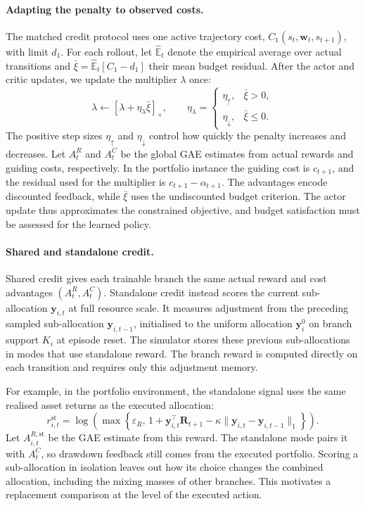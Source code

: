 \documentclass[10pt]{article}
\begin{document}
\paragraph{Adapting the penalty to observed costs.}
The matched credit protocol uses one active trajectory cost, $C_1(s_t,\bm w_t,s_{t+1})$, with limit $d_1$. For each rollout, let $\widehat{\mathbb E}_t$ denote the empirical average over actual transitions and $\bar\xi=\widehat{\mathbb E}_t[C_1-d_1]$ their mean budget residual. After the actor and critic updates, we update the multiplier $\lambda$ once:
\begin{equation}
  \lambda\leftarrow[\lambda+\eta_\lambda\bar\xi]_+,
  \qquad
  \eta_\lambda=
  \begin{cases}
    \eta_\uparrow,&\bar\xi>0,\\
    \eta_\downarrow,&\bar\xi\leq0.
  \end{cases}
  \label{eq:lambda}
\end{equation}
The positive step sizes $\eta_\uparrow$ and $\eta_\downarrow$ control how quickly the penalty increases and decreases. Let $A_t^R$ and $A_t^C$ be the global GAE estimates from actual rewards and guiding costs, respectively. In the portfolio instance the guiding cost is $c_{t+1}$, and the residual used for the multiplier is $c_{t+1}-\alpha_{t+1}$. The advantages encode discounted feedback, while $\bar\xi$ uses the undiscounted budget criterion. The actor update thus approximates the constrained objective, and budget satisfaction must be assessed for the learned policy.

\paragraph{Shared and standalone credit.}
Shared credit gives each trainable branch the same actual reward and cost advantages $(A_t^R,A_t^C)$. Standalone credit instead scores the current sub-allocation $\bm y_{i,t}$ at full resource scale. It measures adjustment from the preceding sampled sub-allocation $\bm y_{i,t-1}$, initialised to the uniform allocation $\bm y_i^0$ on branch support $K_i$ at episode reset. The simulator stores these previous sub-allocations in modes that use standalone reward. The branch reward is computed directly on each transition and requires only this adjustment memory.

For example, in the portfolio environment, the standalone signal uses the same realised asset returns as the executed allocation:
\begin{equation}
  r_{i,t}^{\mathrm{st}}=
  \log\!\left(\max\left\{\varepsilon_R,\,
    1+\bm y_{i,t}^{\top}\bm R_{t+1}
      -\kappa\lVert\bm y_{i,t}-\bm y_{i,t-1}\rVert_1\right\}\right).
  \label{eq:standalone-reward}
\end{equation}
Let $A_{i,t}^{R,\mathrm{st}}$ be the GAE estimate from this reward. The standalone mode pairs it with $A_t^C$, so drawdown feedback still comes from the executed portfolio. Scoring a sub-allocation in isolation leaves out how its choice changes the combined allocation, including the mixing masses of other branches. This motivates a replacement comparison at the level of the executed action.
\end{document}
